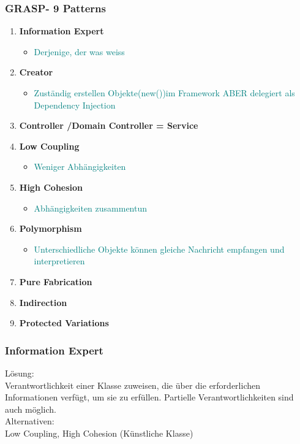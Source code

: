 \documentclass[../ZF_SWEN1.tex]{subfiles}
\begin{document}
{{\subsubsection{GRASP- 9 Patterns}
\begin{enumerate}
	\item \textbf{Information Expert}
	\begin{itemize}
		\item \textcolor {teal} {Derjenige, der was weiss}
	\end{itemize}
	\item \textbf{Creator}
		\begin{itemize}
		\item \textcolor {teal} {Zuständig erstellen Objekte(new())im Framework ABER delegiert als Dependency Injection}
	\end{itemize}
	\item \textbf{Controller /Domain Controller = Service}
	\item \textbf{Low Coupling}
		\begin{itemize}
		\item \textcolor {teal} {Weniger Abhängigkeiten}
	\end{itemize}
	\item \textbf{High Cohesion}
		\begin{itemize}
		\item \textcolor {teal} {Abhängigkeiten zusammentun}
	\end{itemize}
	\item \textbf{Polymorphism}
		\begin{itemize}
		\item \textcolor {teal} {Unterschiedliche Objekte können gleiche Nachricht empfangen und interpretieren}
	\end{itemize}
	\item \textbf{Pure Fabrication}
	\item \textbf{Indirection}
	\item \textbf{Protected Variations}
\end{enumerate}

\subsubsection{Information Expert}

Lösung:\\
Verantwortlichkeit einer Klasse zuweisen, die über die erforderlichen Informationen verfügt, um sie zu erfüllen. Partielle Verantwortlichkeiten sind auch möglich.\\
Alternativen:\\
Low Coupling, High Cohesion (Künstliche Klasse)



}}
\end{document}
